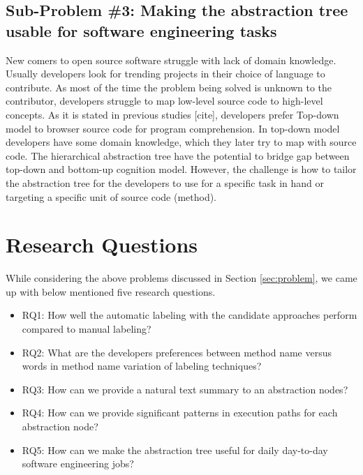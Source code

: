    

    \subsection{Sub-Problem \#3: Making the abstraction tree usable for software engineering tasks} 
    
    New comers to open source software struggle with lack of domain knowledge. Usually developers look for trending projects in their choice of language to contribute. As most of the time the problem being solved is unknown to the contributor, developers struggle to map low-level source code to high-level concepts. As it is stated in previous studies [cite], developers prefer Top-down model to browser source code for program comprehension. In top-down model developers have some domain knowledge, which they later try to map with source code. The hierarchical abstraction tree have the potential to bridge gap between top-down and bottom-up cognition model. However, the challenge is how to tailor the abstraction tree for the developers to use for a specific task in hand or targeting a specific unit of source code (method). 
    
    
\section{Research Questions}   
While considering the above problems discussed in Section \ref{sec:problem}, we came up with below mentioned five research questions.
\begin{itemize}
    \item RQ1: How well the automatic labeling with the candidate approaches perform compared to manual labeling?
    \item RQ2: What are the developers preferences between method name versus words in method name variation of labeling techniques?
    \item RQ3: How can we provide a natural text summary to an abstraction nodes?
    \item RQ4: How can we provide significant patterns in execution paths for each abstraction node?
    \item RQ5: How can we make the abstraction tree useful for daily day-to-day software engineering jobs?
    
\end{itemize}

